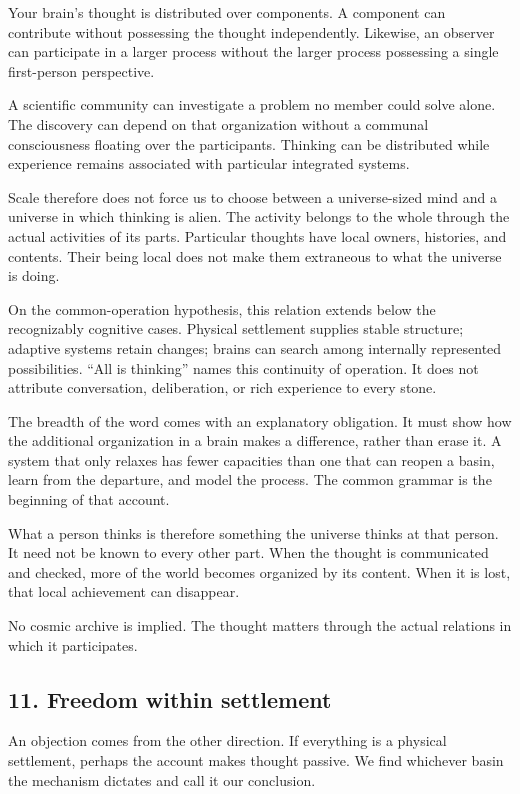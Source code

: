 \documentclass[
  11pt,
]{article}
\begin{document}
Your brain's thought is distributed over components. A component can
contribute without possessing the thought independently. Likewise, an
observer can participate in a larger process without the larger process
possessing a single first-person perspective.

A scientific community can investigate a problem no member could solve
alone. The discovery can depend on that organization without a communal
consciousness floating over the participants. Thinking can be
distributed while experience remains associated with particular
integrated systems.

Scale therefore does not force us to choose between a universe-sized
mind and a universe in which thinking is alien. The activity belongs to
the whole through the actual activities of its parts. Particular
thoughts have local owners, histories, and contents. Their being local
does not make them extraneous to what the universe is doing.

On the common-operation hypothesis, this relation extends below the
recognizably cognitive cases. Physical settlement supplies stable
structure; adaptive systems retain changes; brains can search among
internally represented possibilities. ``All is thinking'' names this
continuity of operation. It does not attribute conversation,
deliberation, or rich experience to every stone.

The breadth of the word comes with an explanatory obligation. It must
show how the additional organization in a brain makes a difference,
rather than erase it. A system that only relaxes has fewer capacities
than one that can reopen a basin, learn from the departure, and model
the process. The common grammar is the beginning of that account.

What a person thinks is therefore something the universe thinks at that
person. It need not be known to every other part. When the thought is
communicated and checked, more of the world becomes organized by its
content. When it is lost, that local achievement can disappear.

No cosmic archive is implied. The thought matters through the actual
relations in which it participates.

\subsection{11. Freedom within
settlement}\label{freedom-within-settlement}

An objection comes from the other direction. If everything is a physical
settlement, perhaps the account makes thought passive. We find whichever
basin the mechanism dictates and call it our conclusion.
\end{document}
